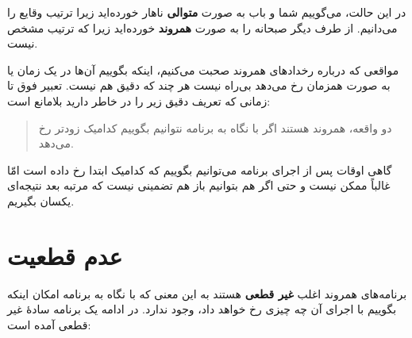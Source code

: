 \documentclass{book}
\begin{document}

    در این حالت، می‌گوییم شما و باب به صورت \textbf{متوالی} ناهار خورده‌اید زیرا 
    ترتیب وقایع را می‌دانیم. از طرف دیگر صبحانه را به صورت  \textbf{همروند} خورده‌اید 
    زیرا که ترتیب مشخص نیست. 
    
    مواقعی که درباره رخدادهای همروند صحبت می‌کنیم، اینکه بگوییم آن‌ها در یک زمان یا به صورت همزمان رخ می‌دهد بی‌راه نیست هر چند که دقیق هم نیست. 
    تعبیر فوق تا زمانی که تعریف دقیق زیر را در خاطر دارید بلامانع است:

\begin{quote}
    دو واقعه، همروند هستند اگر با نگاه به برنامه نتوانیم بگوییم کدامیک زودتر رخ می‌دهد. 
\end{quote}

    گاهی اوقات پس از اجرای برنامه می‌‌توانیم بگوییم که کدامیک ابتدا رخ داده است امّا غالباً ممکن نیست و حتی اگر هم بتوانیم 
    باز هم تضمینی نیست که مرتبه بعد نتیجه‌ای یکسان بگیریم. 
\newpage
\section{عدم قطعیت}

    برنامه‌های همروند اغلب \textbf{غیر قطعی} هستند به این معنی که با نگاه به برنامه 
    امکان اینکه بگوییم با اجرای آن چه چیزی رخ خواهد داد، وجود ندارد. در ادامه یک برنامه سادهٔ غیر قطعی آمده است:
\end{document}
